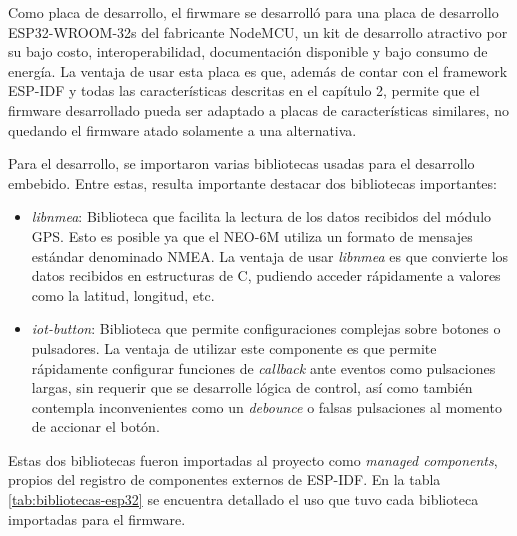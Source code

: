 Como placa de desarrollo, el firwmare se desarrolló para una placa de desarrollo ESP32-WROOM-32s del fabricante NodeMCU, un kit de desarrollo atractivo por su bajo costo, interoperabilidad, documentación disponible y bajo consumo de energía. La ventaja de usar esta placa es que, además de contar con el framework ESP-IDF y todas las características descritas en el capítulo 2, permite que el firmware desarrollado pueda ser adaptado a placas de características similares, no quedando el firmware atado solamente a una alternativa.

Para el desarrollo, se importaron varias bibliotecas usadas para el desarrollo embebido. Entre estas, resulta importante destacar dos bibliotecas importantes:
\begin{itemize}
	\item \textit{libnmea}: Biblioteca que facilita la lectura de los datos recibidos del módulo GPS\citep{LIBNMEA:1}. Esto es posible ya que el NEO-6M utiliza un formato de mensajes estándar denominado NMEA\citep{NMEA:1}. La ventaja de usar \textit{libnmea} es que convierte los datos recibidos en estructuras de C, pudiendo acceder rápidamente a valores como la latitud, longitud, etc.
	\item \textit{iot-button}: Biblioteca que permite configuraciones complejas sobre botones o pulsadores\citep{BUTTON:1}. La ventaja de utilizar este componente es que permite rápidamente configurar funciones de \textit{callback} ante eventos como pulsaciones largas, sin requerir que se desarrolle lógica de control, así como también contempla inconvenientes como un \textit{debounce} o falsas pulsaciones al momento de accionar el botón\citep{DEBOUNCE:1}.
\end{itemize}

Estas dos bibliotecas fueron importadas al proyecto como \textit{managed components}, propios del registro de componentes externos de ESP-IDF\citep{ESPIDF:1}. En la tabla \ref{tab:bibliotecas-esp32} se encuentra detallado el uso que tuvo cada biblioteca importadas para el firmware.

